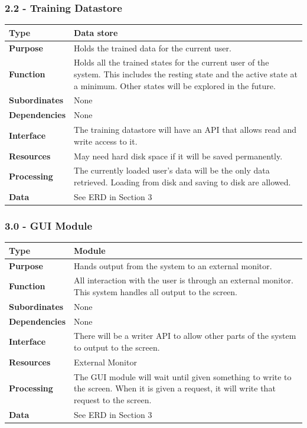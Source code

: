 \documentclass{article}
\begin{document}
\subsubsection*{2.2 - Training Datastore}
\begin{tabular}{ | l |  p{13.3cm} |}
\hline
\textbf{Type} & Data store \\ \hline
\textbf{Purpose} & Holds the trained data for the current user. \\ \hline
\textbf{Function} & Holds all the trained states for the current user of the system. This includes the resting state and the active state at a minimum. Other states will be explored in the future. \\ \hline
\textbf{Subordinates} & None \\ \hline
\textbf{Dependencies} & None \\ \hline
\textbf{Interface} & The training datastore will have an API that allows read and write access to it. \\ \hline
\textbf{Resources} & May need hard disk space if it will be saved permanently.  \\ \hline
\textbf{Processing} & The currently loaded user's data will be the only data retrieved. Loading from disk and saving to disk are allowed. \\ \hline
\textbf{Data} & See ERD in Section 3 \\ \hline
\end{tabular}

\subsubsection*{3.0 - GUI Module}
\begin{tabular}{ | l |  p{13.3cm} |}
\hline
\textbf{Type} & Module \\ \hline
\textbf{Purpose} & Hands output from the system to an external monitor. \\ \hline
\textbf{Function} & All interaction with the user is through an external monitor. This system handles all output to the screen. \\ \hline
\textbf{Subordinates} & None \\ \hline
\textbf{Dependencies} & None \\ \hline
\textbf{Interface} & There will be a writer API to allow other parts of the system to output to the screen. \\ \hline
\textbf{Resources} & External Monitor \\ \hline
\textbf{Processing} & The GUI module will wait until given something to write to the screen. When it is given a request, it will write that request to the screen. \\ \hline
\textbf{Data} & See ERD in Section 3 \\ \hline
\end{tabular}
\end{document}
